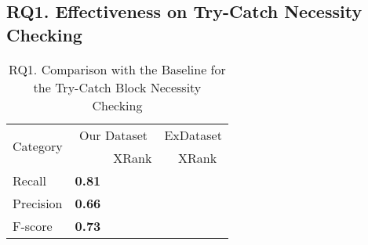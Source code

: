 \subsection{RQ1. Effectiveness on Try-Catch Necessity Checking}
\label{sec:rq1}

\begin{table}[h]
	\caption{RQ1. Comparison with the Baseline for the Try-Catch Block Necessity Checking}
	\begin{center}
		\renewcommand{\arraystretch}{1}
		\begin{tabular}{p{1.5cm}<{\centering}|p{1.25cm}<{\centering}p{1.25cm}<{\centering}|p{1.25cm}<{\centering}p{1.25cm}<{\centering}}
			\hline
			\multirow{2}{*}{Category} & \multicolumn{2}{c|}{Our Dataset} & \multicolumn{2}{c}{ExDataset}\\
			\cline{2-5}
			  & \tool  & XRank & \tool  & XRank\\
			\hline
			Recall    & \textbf{0.81} & &&\\
			Precision & \textbf{0.66} & &&\\
			F-score   & \textbf{0.73} & &&\\
			\hline
		\end{tabular}
		\label{RQ1_results_1}
	\end{center}
\end{table}

{\color{red}{This section waiting for the XRank Results. But from the current estimate, our approach should have higher F-score. But the recall and precision I'm not sure. Once I have the results, I will update this section.}}